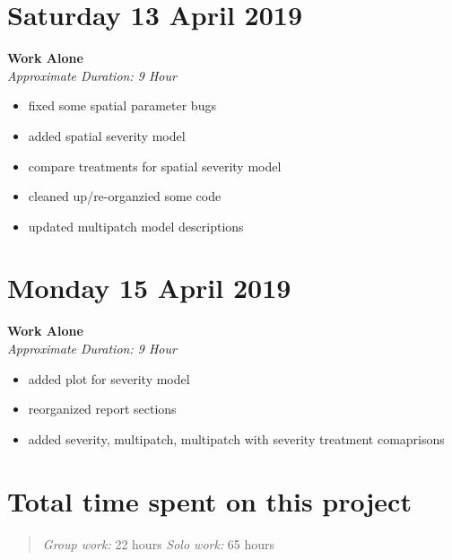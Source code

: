 \documentclass[12pt]{article}\usepackage[]{graphicx}\usepackage[]{color}
\begin{document}
\section*{Saturday 13 April 2019}
\textbf{Work Alone} \\
\emph{Approximate Duration: 9 Hour}
\begin{itemize}
    \item fixed some spatial parameter bugs
    \item added spatial severity model
    \item compare treatments for spatial severity model
    \item cleaned up/re-organzied some code
    \item updated multipatch model descriptions
\end{itemize}
\section*{Monday 15 April 2019}
\textbf{Work Alone} \\
\emph{Approximate Duration: 9 Hour}
\begin{itemize}
    \item added plot for severity model
    \item reorganized report sections
    \item added severity, multipatch, multipatch with severity treatment comaprisons
\end{itemize}
\section*{Total time spent on this project}
\begin{quote}
\emph{Group work:} 22 hours
\emph{Solo work:} 65 hours
\end{quote}
\end{document}
